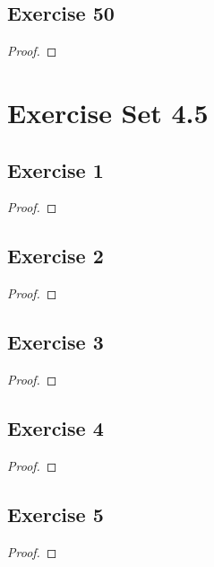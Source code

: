 \documentclass[14pt]{extarticle}
\begin{document}
\subsection{Exercise 50}

\begin{proof}

\end{proof}

\section{Exercise Set 4.5}

\subsection{Exercise 1}

\begin{proof}

\end{proof}

\subsection{Exercise 2}

\begin{proof}

\end{proof}

\subsection{Exercise 3}

\begin{proof}

\end{proof}

\subsection{Exercise 4}

\begin{proof}

\end{proof}

\subsection{Exercise 5}

\begin{proof}

\end{proof}
\end{document}
